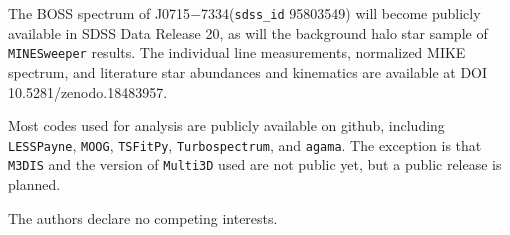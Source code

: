 \documentclass{natureprintstyle}
\newcommand{\code}[1]{\texttt{#1}\xspace}
\newcommand{\umpstar}{J0715$-$7334\xspace}
\begin{document}
\begin{addendum}
\item[Data Availability] 
The BOSS spectrum of \umpstar (\texttt{sdss\_id} 95803549) will become publicly available in SDSS Data Release 20, as will the background halo star sample of \code{MINESweeper} results.
The individual line measurements, normalized MIKE spectrum, and literature star abundances and kinematics are available at DOI 10.5281/zenodo.18483957\cite{ZenodoLink}.

\item[Code Availability] 
Most codes used for analysis are publicly available on github, including
{\code{LESSPayne}}\cite{Ji2025ascl}, 
{\code{MOOG}}\cite{Sneden1973,Sobeck2011,Sneden2012}, 
{\code{TSFitPy}}\cite{Gerber2023},
{\code{Turbospectrum}}\cite{Plez2012}, and
{\code{agama}}\cite{Vasiliev2019}.
The exception is that {\code{M3DIS}}\cite{Eitner2024} and the version of \code{Multi3D} used are not public yet, but a public release is planned.

\item[Competing Interests] The authors declare no competing interests.

\end{addendum}


\end{document}
